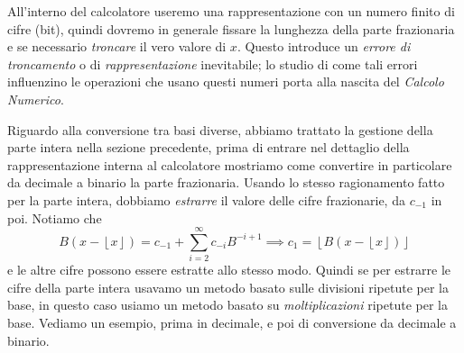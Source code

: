 All'interno del calcolatore useremo una rappresentazione con un numero finito
di cifre (bit), quindi dovremo in generale fissare la lunghezza della parte
frazionaria e se necessario \emph{troncare} il vero valore di $x$. Questo
introduce un \emph{errore di troncamento} o di \emph{rappresentazione}
inevitabile; lo studio di come tali errori influenzino le operazioni che
usano questi numeri porta alla nascita del \emph{Calcolo
Numerico}.

Riguardo alla conversione tra basi diverse, abbiamo trattato la gestione della
parte intera nella sezione precedente, prima di entrare nel dettaglio della
rappresentazione interna al calcolatore mostriamo come convertire in
particolare da decimale a binario la parte frazionaria.
Usando lo stesso ragionamento fatto per la parte intera, dobbiamo
\emph{estrarre} il valore delle cifre frazionarie, da $c_{-1}$ in poi. 
Notiamo che \[
B(x - \left\lfloor x \right \rfloor) = c_{-1} + \sum_{i=2}^{\infty} c_{-i}B^{-i+1}
\implies c_1 = \left\lfloor B(x - \left\lfloor x \right\rfloor) \right\rfloor \]
e le altre cifre possono essere estratte allo stesso modo. 
Quindi se per estrarre le cifre della parte intera usavamo un metodo basato
sulle divisioni ripetute per la base, in questo caso usiamo un metodo basato
su \emph{moltiplicazioni} ripetute per la base.
Vediamo un esempio, prima in decimale, e poi di conversione da decimale a binario.

